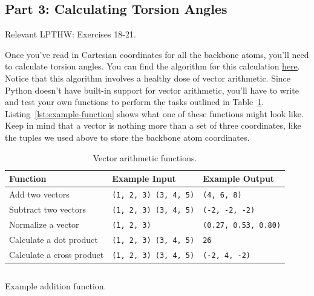 \documentclass{article}
\newenvironment{lpthw}
{Relevant LPTHW:}
{}
\begin{document}
\subsection{Part 3: Calculating Torsion Angles}

\begin{lpthw}
Exercises 18-21.
\end{lpthw}

Once you've read in Cartesian coordinates for all the backbone atoms, you'll 
need to calculate torsion angles.  You can find the algorithm for this 
calculation 
\href{http://math.stackexchange.com/questions/47059/how-do-i-calculate-a-dihedral-angle-given-cartesian-coordinates}{here}.  
Notice that this algorithm involves a healthy dose of vector arithmetic.  Since 
Python doesn't have built-in support for vector arithmetic, you'll have to 
write and test your own functions to perform the tasks outlined in 
Table~\ref{tab:vector-functions}.  Listing~\ref{lst:example-function} shows 
what one of these functions might look like.  Keep in mind that a vector is 
nothing more than a set of three coordinates, like the tuples we used above to 
store the backbone atom coordinates.  

\begin{table}[h]
\centering
\begin{tabular}{lll}
\toprule
Function                  & Example Input                & Example Output              \\
\midrule
Add two vectors           &
 \texttt{(1, 2, 3) (3, 4, 5)} & \texttt{(4, 6, 8)}          \\
Subtract two vectors      &
 \texttt{(1, 2, 3) (3, 4, 5)} & \texttt{(-2, -2, -2)}       \\
Normalize a vector        &
 \texttt{(1, 2, 3)}           & \texttt{(0.27, 0.53, 0.80)} \\
Calculate a dot product   &
 \texttt{(1, 2, 3) (3, 4, 5)} & \texttt{26}                 \\
Calculate a cross product &
 \texttt{(1, 2, 3) (3, 4, 5)} & \texttt{(-2, 4, -2)}        \\
\bottomrule
\end{tabular}
\caption{Vector arithmetic functions.}
\label{tab:vector-functions}
\end{table}

\begin{listing}[h]
 \inputminted{python}{example-function.py}
 \caption{Example addition function.}
 \label{lst:example-function}
\end{listing}
\end{document}
